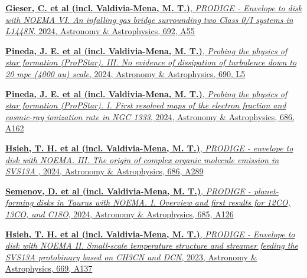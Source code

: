 \begin{cvparagraph}
\begin{cvitems}
    \item{\href{https://ui.adsabs.harvard.edu/abs/2024arXiv241018941G/abstract}{\textbf{Gieser, C. et al (incl. Valdivia-Mena, M. T.)}, \textit{PRODIGE - Envelope to disk with NOEMA VI. An infalling gas bridge surrounding two Class 0/I systems in L1448N}, 2024, Astronomy \& Astrophysics, 692, A55}}
    
    \item{\href{https://ui.adsabs.harvard.edu/abs/2024A%26A...690L...5P/abstract}{\textbf{Pineda, J. E. et al (incl. Valdivia-Mena, M. T.)}, \textit{Probing the physics of star formation (ProPStar). III. No evidence of dissipation of turbulence down to 20 mpc (4000 au) scale}, 2024, Astronomy \& Astrophysics, 690, L5}}
	\item{\href{https://ui.adsabs.harvard.edu/abs/2024A%26A...686A.162P/abstract}{\textbf{Pineda, J. E. et al (incl. Valdivia-Mena, M. T.)}, \textit{Probing the physics of star formation (ProPStar). I. First resolved maps of the electron fraction and cosmic-ray ionization rate in NGC 1333}, 2024, Astronomy \& Astrophysics, 686, A162}}
	\item{\href{https://ui.adsabs.harvard.edu/abs/2024A%26A...686A.289H/abstract}{\textbf{Hsieh, T. H. et al (incl. Valdivia-Mena, M. T.)}, \textit{PRODIGE - envelope to disk with NOEMA. III. The origin of complex organic molecule emission in SVS13A }, 2024, Astronomy \& Astrophysics, 686, A289}}
	\item{\href{https://ui.adsabs.harvard.edu/abs/2024A%26A...685A.126S/abstract}{\textbf{Semenov, D. et al (incl. Valdivia-Mena, M. T.)}, \textit{PRODIGE - planet-forming disks in Taurus with NOEMA. I. Overview and first results for 12CO, 13CO, and C18O}, 2024, Astronomy \& Astrophysics,  685, A126}}
	\item{\href{https://ui.adsabs.harvard.edu/abs/2023A%26A...669A.137H/abstract}{\textbf{Hsieh, T. H. et al (incl. Valdivia-Mena, M. T.)}, \textit{PRODIGE - Envelope to disk with NOEMA II. Small-scale temperature structure and streamer feeding the SVS13A protobinary based on CH3CN and DCN}, 2023, Astronomy \& Astrophysics, 669, A137}}
	
\end{cvitems}
\vspace{4pt}
\end{cvparagraph}


